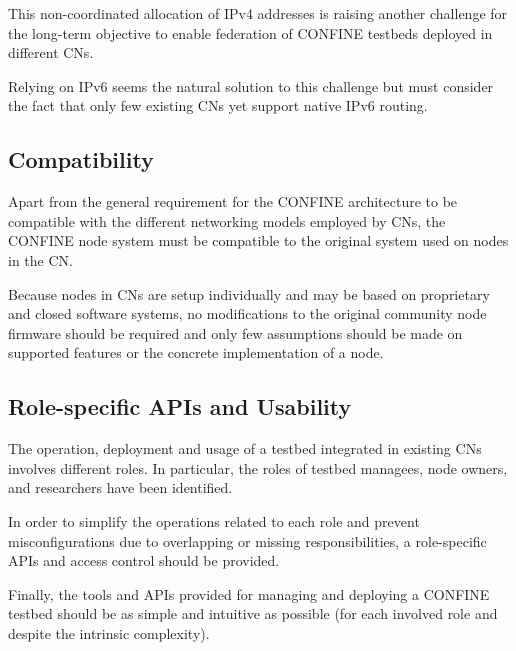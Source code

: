 \documentclass[conference]{IEEEtran}
\begin{document}
This non-coordinated allocation of IPv4 addresses is raising another
challenge for the long-term objective to enable federation of CONFINE
testbeds deployed in different CNs.

Relying on IPv6 seems the natural solution to this challenge but must
consider the fact that only few existing CNs yet support native IPv6
routing.

\subsection{Compatibility}

Apart from the general requirement for the CONFINE architecture to be
compatible with the different networking models employed by CNs, the
CONFINE node system must be compatible to the original system used on
nodes in the CN.

Because nodes in CNs are setup individually and may be based on
proprietary and closed software systems, no modifications to the
original community node firmware should be required and only few
assumptions should be made on supported features or the concrete
implementation of a node.


\subsection{Role-specific APIs and Usability}

The operation, deployment and usage of a testbed integrated in
existing CNs involves different roles. In particular, the roles of
testbed managees, node owners, and researchers have been identified.

In order to simplify the operations related to each role and prevent
misconfigurations due to overlapping or missing responsibilities, a
role-specific APIs  and access control should be provided.

Finally, the tools and APIs provided for managing and deploying a
CONFINE testbed should be as simple and intuitive as possible (for
each involved role and despite the intrinsic complexity).
\end{document}
